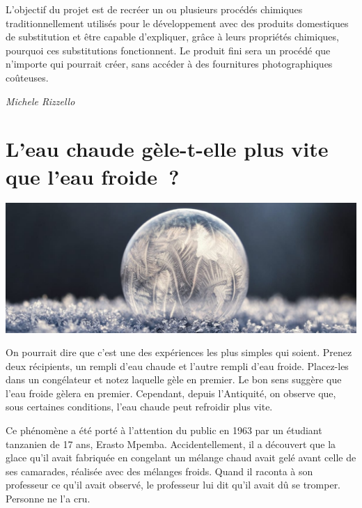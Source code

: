 \documentclass[
  10pt,
  french,
  a5paper,
  openany]{book}
\newenvironment{signature}{\begin{flushright}}{\end{flushright}}
\begin{document}
L'objectif du projet est de recréer un ou plusieurs procédés chimiques traditionnellement utilisés pour le développement avec des produits domestiques de substitution et être capable d'expliquer, grâce à leurs propriétés chimiques, pourquoi ces substitutions fonctionnent. Le produit fini sera un procédé que n'importe qui pourrait créer, sans accéder à des fournitures photographiques coûteuses.

\begin{signature}
\emph{Michele Rizzello}

\end{signature}

\hypertarget{leau-chaude-guxe8le-t-elle-plus-vite-que-leau-froide}{%
\chapter{\texorpdfstring{L'eau chaude gèle-t-elle \linebreak plus vite que l'eau froide~?}{L'eau chaude gèle-t-elle plus vite que l'eau froide~?}}\label{leau-chaude-guxe8le-t-elle-plus-vite-que-leau-froide}}

\begin{center}
\includegraphics[width=1\textwidth,height=\textheight]{images/eau-chaude.jpg}

\end{center}

On pourrait dire que c'est une des expériences les plus simples qui soient. Prenez deux récipients, un rempli d'eau chaude et l'autre rempli d'eau froide. Placez-les dans un congélateur et notez laquelle gèle en premier. Le bon sens suggère que l'eau froide gèlera en premier. Cependant, depuis l'Antiquité, on observe que, sous certaines conditions, l'eau chaude peut refroidir plus vite.

Ce phénomène a été porté à l'attention du public en 1963 par un étudiant tanzanien de 17 ans, Erasto Mpemba. Accidentellement, il a découvert que la glace qu'il avait fabriquée en congelant un mélange chaud avait gelé avant celle de ses camarades, réalisée avec des mélanges froids. Quand il raconta à son professeur ce qu'il avait observé, le professeur lui dit qu'il avait dû se tromper. Personne ne l'a cru.
\end{document}
